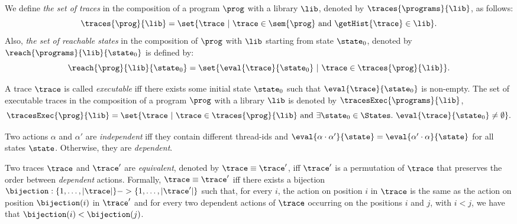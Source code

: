 We define \emph{the set of traces} in the composition of a program $\prog$ with a library $\lib$, denoted by $\traces{\programs}{\lib}$, as follows:
\[
\traces{\prog}{\lib} =
\set{\trace\ |\ \trace \in \sem{\prog} \mbox{ and }
  \getHist{\trace} \in \lib}.
\]
Also, \emph{the set of reachable states} in the composition of $\prog$ with $\lib$ starting from state $\state_0$, denoted by $\reach{\programs}{\lib}{\state_0}$ is defined by:
\[
\reach{\prog}{\lib}{\state_0} =
\set{\eval{\trace}{\state_0}\ |\ \trace \in \traces{\prog}{\lib}}.
\]

A trace $\trace$ is called \emph{executable} iff there exists some initial state $\state_0$ such that $\eval{\trace}{\state_0}$ is non-empty. The set of executable traces in the composition of a program $\prog$ with a library $\lib$ is denoted by $\tracesExec{\programs}{\lib}$, \ie
\[
\tracesExec{\prog}{\lib} =
\set{\trace\ |\ \trace \in \traces{\prog}{\lib} \mbox{ and }
  \exists \state_0\in\States.\ \eval{\trace}{\state_0}\neq\emptyset}.
\]

Two actions $\alpha$ and $\alpha'$ are \emph{independent} iff they contain different thread-ids and $\eval{\alpha\cdot\alpha'}{\state}=\eval{\alpha'\cdot\alpha}{\state}$ for all states $\state$. Otherwise, they are \emph{dependent}.

Two traces $\trace$ and $\trace'$ are \emph{equivalent}, denoted by $\trace\equiv\trace'$, iff $\trace'$ is a permutation of $\trace$ that preserves the order between \emph{dependent} actions.
Formally, $\trace\equiv\trace'$ iff there exists a bijection $\bijection:\{1,\ldots,|\trace|\}->\{1,\ldots,|\trace'|\}$ such that, for every $i$, the action on position $i$ in $\trace$ is the same as the action on position $\bijection(i)$ in $\trace'$ and for every two dependent actions of $\trace$ occurring on the positions $i$ and $j$, with $i<j$, we have that $\bijection(i)<\bijection(j)$.




